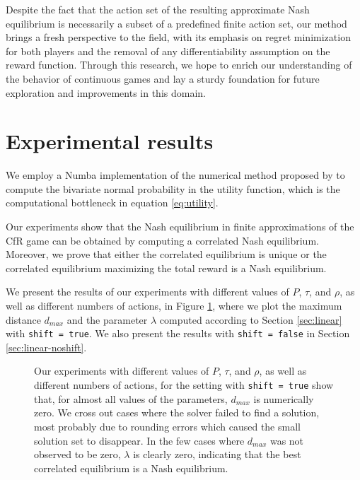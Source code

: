 \documentclass[preprint,12pt,authoryear]{elsarticle}
\theoremstyle{definition}
\begin{document}
Despite the fact that the action set of the resulting approximate Nash equilibrium is necessarily a subset of a predefined finite action set, our method brings a fresh perspective to the field, with its emphasis on regret minimization for both players and the removal of any differentiability assumption on the reward function. Through this research, we hope to enrich our understanding of the behavior of continuous games and lay a sturdy foundation for future exploration and improvements in this domain.

\section{Experimental results}

We employ a Numba \citep{lam2015numba}  implementation of the numerical method proposed by \citet{genz2004numerical} to compute the bivariate normal probability in the utility function, which is the computational bottleneck in equation \ref{eq:utility}.

Our experiments show that the Nash equilibrium in finite approximations of the CfR game can be obtained by computing a correlated Nash equilibrium. Moreover, we prove that either the correlated equilibrium is unique or the correlated equilibrium maximizing the total reward is a Nash equilibrium.

We present the results of our experiments with different values of $P$, $\tau$, and $\rho$, as well as different numbers of actions, in Figure \ref{fig:linear-shift}, where we plot the maximum distance $d_{max}$ and the parameter $\lambda$ computed according to Section \ref{sec:linear} with \texttt{shift = true}. We also present the results with \texttt{shift = false} in Section \ref{sec:linear-noshift}.

\begin{figure}[htbp]
  \centering
  \begin{minipage}[t]{0.48\textwidth}
    \centering
    
  \end{minipage}
  \hfill
  \begin{minipage}[t]{0.48\textwidth}
    \centering
    
  \end{minipage}
  \caption{Our experiments with different values of $P$, $\tau$, and $\rho$, as well as different numbers of actions, for the setting with \texttt{shift = true} show that, for almost all values of the parameters, $d_{max}$ is numerically zero. We cross out cases where the solver failed to find a solution, most probably due to rounding errors which caused the small solution set to disappear. In the few cases where $d_{max}$ was not observed to be zero, $\lambda$ is clearly zero, indicating that the best correlated equilibrium is a Nash equilibrium.}
  \label{fig:linear-shift}  
\end{figure}
\end{document}
